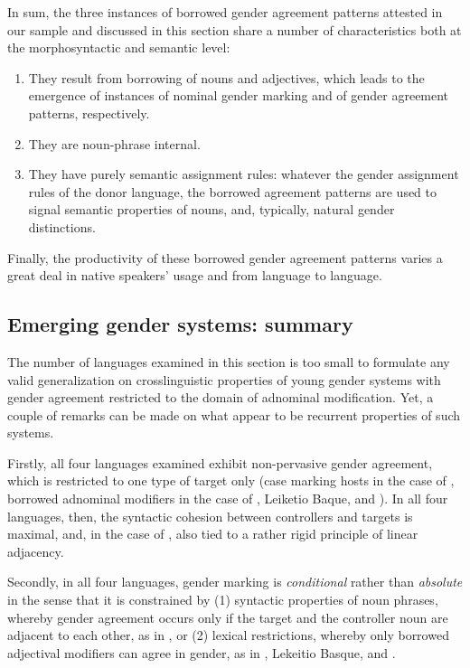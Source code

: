 \documentclass[output=collectionpaper]{langsci/langscibook}
\begin{document}
In sum,  the three instances of borrowed gender agreement patterns attested in our sample and discussed in this section share a number of characteristics both at the morphosyntactic and semantic level:
\begin{enumerate}
\item They result from borrowing of nouns and adjectives, which leads to the emergence of instances of nominal gender marking and of gender agreement patterns, respectively.
\item They are noun-phrase internal.
\item They have purely semantic assignment rules: whatever the gender assignment rules of the donor language, the borrowed agreement patterns are used to signal semantic properties of nouns, and, typically, natural gender distinctions.
\end{enumerate}

Finally, the productivity of these borrowed gender agreement patterns varies a great deal in native speakers' usage and from language to language.

\subsection{Emerging gender systems: summary}
The number of languages examined in this section is too small to formulate any valid generalization on crosslinguistic properties of young gender systems with gender agreement restricted to the domain of adnominal modification. Yet, a couple of remarks can be made on what appear to be recurrent properties of such systems.

Firstly, all four languages examined exhibit non-pervasive gender agreement, which is restricted to one type of target only (case marking hosts in the case of , borrowed adnominal modifiers in the case of , Leiketio Baque, and ). In all four languages, then, the syntactic cohesion between controllers and targets is maximal, and, in the case of , also tied to a rather rigid principle of linear adjacency.

Secondly, in all four languages, gender marking is \textit{conditional} rather than \textit{absolute} in the sense that it is constrained by (1) syntactic properties of noun phrases, whereby gender agreement occurs only if the target and the controller noun are adjacent to each other, as in , or (2) lexical restrictions, whereby only borrowed adjectival modifiers can agree in gender, as in , Lekeitio Basque, and .
\end{document}
